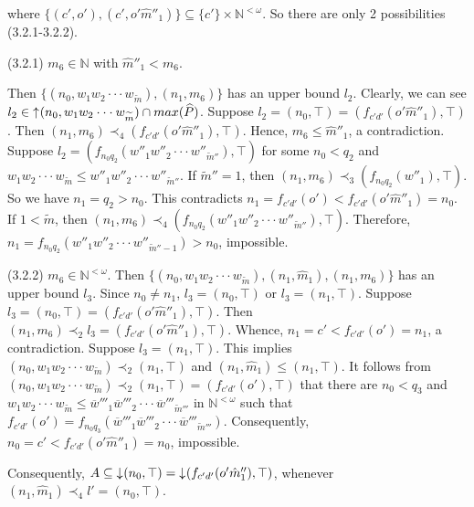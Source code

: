 \documentclass[preprint,12pt]{elsarticle}
\numberwithin{equation}{section}
\newcommand{\dn}{\mathord{\downarrow}\hspace{0.05em}}
\newcommand{\up}{\mathord{\uparrow}\hspace{0.05em}}
\begin{document}
where $\{(c',o'),(c',o'\hat{m}''_{1})\}\subseteq\{c'\}\times\mathbb{N}^{<\omega}$.
So there are only 2 possibilities (3.2.1-3.2.2).



(3.2.1) $m_{6}\in\mathbb{N}$ with $\hat{m}''_{1}<m_{6}$.

Then $\{(n_{0},w_{1}w_{2}\cdot\cdot\cdot w_{\widetilde{m}}),(n_{1},m_{6})\}$ has an upper bound $l_{2}$. Clearly, we can see
$l_{2}\in\up(n_{0},w_{1}w_{2}\cdot\cdot\cdot w_{\widetilde{m}})\cap max(\widehat{P})$. Suppose $l_{2}=(n_{0},\top)=(f_{c'd'}(o'\hat{m}''_{1}),\top)$. Then $(n_{1},m_{6})\prec_{4}(f_{c'd'}(o'\hat{m}''_{1}),\top)$. Hence, $m_{6}\leq\hat{m}''_{1}$, a contradiction. Suppose $l_{2}=(f_{n_{0}q_{2}}(w''_{1}w''_{2}\cdot\cdot\cdot w''_{\widetilde{m}''}),\top)$ for some $n_{0}<q_{2}$ and $w_{1}w_{2}\cdot\cdot\cdot w_{\widetilde{m}}\leq w''_{1}w''_{2}\cdot\cdot\cdot w''_{\widetilde{m}''}$. If $\widetilde{m}''=1$, then
$(n_{1},m_{6})\prec_{3}(f_{n_{0}q_{2}}(w''_{1}),\top)$. So we have $n_{1}=q_{2}>n_{0}$. This contradicts $n_{1}=f_{c'd'}(o')<f_{c'd'}(o'\hat{m}''_{1})=n_{0}$. If $1<\widetilde{m}$, then $(n_{1},m_{6})\prec_{4}(f_{n_{0}q_{2}}(w''_{1}w''_{2}\cdot\cdot\cdot w''_{\widetilde{m}''}),\top)$. Therefore, $n_{1}=f_{n_{0}q_{2}}(w''_{1}w''_{2}\cdot\cdot\cdot w''_{\widetilde{m}''-1})>n_{0}$, impossible.

(3.2.2) $m_{6}\in\mathbb{N}^{<\omega}$. Then $\{(n_{0},w_{1}w_{2}\cdot\cdot\cdot w_{\widetilde{m}}),(n_{1},\hat{m}_{1}),(n_{1},m_{6})\}$ has an upper bound $l_{3}$. Since $n_{0}\neq n_{1}$, $l_{3}=(n_{0},\top)$ or $l_{3}=(n_{1},\top)$. Suppose $l_{3}=(n_{0},\top)=(f_{c'd'}(o'\hat{m}''_{1}),\top)$. Then $(n_{1},m_{6})\prec_{2}l_{3}=(f_{c'd'}(o'\hat{m}''_{1}),\top)$. Whence, $n_{1}=c'<f_{c'd'}(o')=n_{1}$, a contradiction. Suppose $l_{3}=(n_{1},\top)$. This implies $(n_{0},w_{1}w_{2}\cdot\cdot\cdot w_{\widetilde{m}})\prec_{2}(n_{1},\top)$ and $(n_{1},\hat{m}_{1})\leq(n_{1},\top)$. It follows from $(n_{0},w_{1}w_{2}\cdot\cdot\cdot w_{\widetilde{m}})\prec_{2}(n_{1},\top)=(f_{c'd'}(o'),\top)$ that there are $n_{0}<q_{3}$ and $w_{1}w_{2}\cdot\cdot\cdot w_{\widetilde{m}}\leq\overline{w}'''_{1}\overline{w}'''_{2}\cdot\cdot\cdot \overline{w}'''_{\widetilde{m}'''}$ in $\mathbb{N}^{<\omega}$ such that $f_{c'd'}(o')=f_{n_{0}q_{3}}(\overline{w}'''_{1}\overline{w}'''_{2}\cdot\cdot\cdot \overline{w}'''_{\widetilde{m}'''})$.  Consequently, $n_{0}=c'<f_{c'd'}(o'\hat{m}''_{1})=n_{0}$, impossible.

Consequently, $A\subseteq\dn (n_{0},\top)=\dn(f_{c'd'}(o'\hat{m}''_{1}),\top)$, whenever $(n_{1},\hat{m}_{1})\prec_{4}l'=(n_{0},\top)$.
\end{document}

